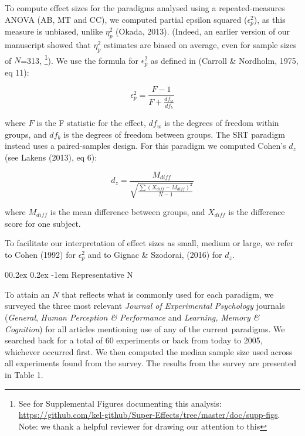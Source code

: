 \documentclass[
  man]{apa6}
\makeatletter
\let\oldparagraph\paragraph
\renewcommand{\paragraph}[1]{\oldparagraph{#1}\mbox{}}
\renewcommand{\paragraph}{\@startsection{paragraph}{4}{\parindent}%
  {0\baselineskip \@plus 0.2ex \@minus 0.2ex}%
  {-1em}%
  {\normalfont\normalsize\bfseries\itshape\typesectitle}}
\makeatother
\begin{document}
To compute effect sizes for the paradigms analysed using a repeated-measures ANOVA (AB, MT and CC), we computed partial epsilon squared (\(\epsilon_{p}^2\)), as this measure is unbiased, unlike \(\eta_{p}^2\) (Okada, 2013). (Indeed, an earlier version of our manuscript showed that \(\eta_{p}^2\) estimates are biased on average, even for sample
sizes of \(N\)=313, \footnote{See for Supplemental Figures documenting this analysis: \url{https://github.com/kel-github/Super-Effects/tree/master/doc/supp-figs}. Note: we thank a helpful reviewer for drawing our attention to this}). We use the formula for \(\epsilon_{p}^2\) as defined in (Carroll \& Nordholm, 1975, eq 11):

\begin{equation}
\epsilon_{p}^{2} = \frac{F-1}{F + \frac{df_w}{df_b}}
\end{equation}

where \(F\) is the F statistic for the effect, \(df_{w}\) is the degrees of freedom within groups, and \(df_{b}\) is the degrees of freedom between groups. The SRT paradigm instead uses a paired-samples design. For this paradigm we computed Cohen's \(d_{z}\) (see Lakens (2013), eq 6):

\begin{equation}
d_{z} = \frac{M_{diff}}{\sqrt{\frac{\sum(X_{diff} - M_{diff})^2}{N-1}}}
\end{equation}

where \(M_{diff}\) is the mean difference between groups, and \(X_{diff}\) is the difference score for one subject.

To facilitate our interpretation of effect sizes as small, medium or large, we refer to Cohen (1992) for \(\epsilon_{p}^2\) and to Gignac \& Szodorai, (2016) for \(d_z\).

\hypertarget{representative-n}{%
\paragraph{Representative N}\label{representative-n}}

To attain an \(N\) that reflects what is commonly used for each paradigm, we surveyed the three most relevant \emph{Journal of Experimental Psychology} journals (\emph{General}, \emph{Human Perception \& Performance} and \emph{Learning, Memory \& Cognition}) for all articles mentioning use of any of the current paradigms. We searched back for a total of 60 experiments or back from today to 2005, whichever occurred first. We then computed the median sample size used across all experiments found from the survey. The results from the survey are presented in Table 1.
\end{document}
